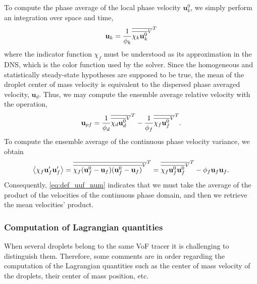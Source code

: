 To compute the phase average of the local phase velocity $\textbf{u}_k^0$, we simply perform an integration over space and time, 
\begin{equation}
    \textbf{u}_k = \frac{1}{\phi_k} \overline{\overline{\chi_k \textbf{u}_k^0}^V}^T
\end{equation}
where the indicator function $\chi_f$ must be understood as its approximation in the DNS, which is the color function used by the solver. 
Since the homogeneous and statistically steady-state hypotheses are supposed to be true, the mean of the droplet center of mass velocity is equivalent to the dispersed phase averaged velocity, $\textbf{u}_d$.
Thus, we may compute the ensemble average relative velocity with the operation, 
\begin{equation}
    \textbf{u}_{pf} = 
    \frac{1}{\phi_d} \overline{\overline{\chi_d \textbf{u}_d^0}^V}^T
    - \frac{1}{\phi_f} \overline{\overline{\chi_f \textbf{u}_f^0}^V}^T. 
\end{equation} 
To compute the ensemble average of the continuous phase velocity variance, we obtain
\begin{equation}
    \avg{\chi_f\textbf{u}_f' \textbf{u}_f'}
    = \Tavg{\Xavg{\chi_f (\textbf{u}_f^0 -\textbf{u}_f ) (\textbf{u}_f^0 -\textbf{u}_f)}}
    = \Tavg{\Xavg{\chi_f \textbf{u}_f^0 \textbf{u}_f^0}}
    -  \phi_f  \textbf{u}_f \textbf{u}_f.
    \label{eq:def_uuf_num} 
\end{equation}
Consequently, \ref{eq:def_uuf_num} indicates that we must take the average of the product of the velocities of the continuous phase domain, and then we retrieve the mean velocities' product.  

\subsubsection{Computation of Lagrangian quantities}

When several droplets belong to the same VoF tracer it is challenging to distinguish them.
Therefore, some comments are in order regarding the computation of the Lagrangian quantities such as the center of mass velocity of the droplets, their center of mass position, etc.    

